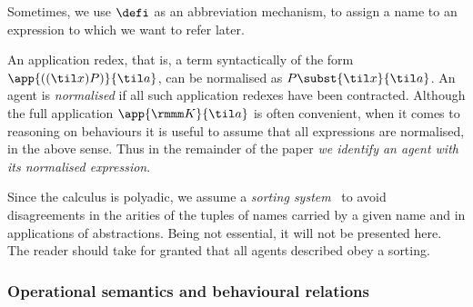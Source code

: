 \ifcutLMCS
Sometimes, we use $\defi$ as an abbreviation mechanism, to
assign a name to an expression to which we want to refer later.
\fi


An {application redex}, that is, a term syntactically of the form 
 $\app{((\til x) P)}{\til a}$, can be normalised as $P \subst {\til x}{\til a}$. An agent is
\emph{normalised} if all such application redexes have been
contracted.
Although the full
application $\app  {\rmmm K}{\til a} $ is often convenient, when
it comes to reasoning on behaviours 
it is useful to assume that all expressions are normalised, in the above sense.
Thus in the remainder of the paper 
\emph{we identify an agent with its normalised expression}.

Since the calculus is polyadic, 
we assume a \emph{sorting system}~\cite{Mil91}
   to avoid disagreements  in the arities of
the tuples of names 
carried by a given name 
and in applications of abstractions.
Being not essential, it will not be presented here.
The reader should
take for granted that all agents described obey a sorting. 



\subsubsection{Operational semantics and behavioural relations}
\label{sss:os_piI}

